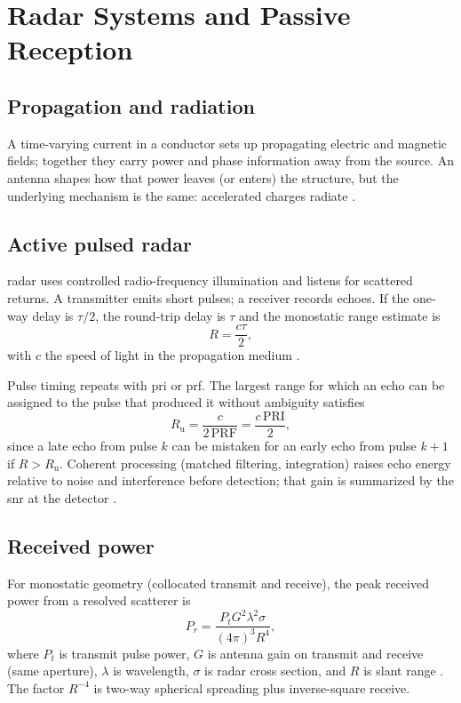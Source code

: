 \section{Radar Systems and Passive Reception}\label{sec:bg:radar}

\subsection{Propagation and radiation}

A time-varying current in a conductor sets up propagating electric and magnetic fields; together they carry power and phase information away from the source. An antenna shapes how that power leaves (or enters) the structure, but the underlying mechanism is the same: accelerated charges radiate \parencite{skolnik2008radar}.

\subsection{Active pulsed radar}

\Gls{radar} uses controlled radio-frequency illumination and listens for scattered returns. A transmitter emits short pulses; a receiver records echoes. If the one-way delay is $\tau/2$, the round-trip delay is $\tau$ and the monostatic range estimate is
\begin{equation}
\label{eq:bg:range}
R = \frac{c\tau}{2},
\end{equation}
with $c$ the speed of light in the propagation medium \parencite{skolnik2008radar}.

Pulse timing repeats with \gls{pri} or \gls{prf}. The largest range for which an echo can be assigned to the pulse that produced it without ambiguity satisfies
\begin{equation}
\label{eq:bg:runamb}
R_{\mathrm{u}} = \frac{c}{2\,\mathrm{PRF}} = \frac{c\,\mathrm{PRI}}{2},
\end{equation}
since a late echo from pulse $k$ can be mistaken for an early echo from pulse $k+1$ if $R > R_{\mathrm{u}}$. Coherent processing (matched filtering, integration) raises echo energy relative to noise and interference before detection; that gain is summarized by the \gls{snr} at the detector \parencite{skolnik2008radar}.

\subsection{Received power}

For monostatic geometry (collocated transmit and receive), the peak received power from a resolved scatterer is
\begin{equation}
\label{eq:bg:radar}
P_r = \frac{P_t G^2 \lambda^2 \sigma}{(4\pi)^3 R^4},
\end{equation}
where $P_t$ is transmit pulse power, $G$ is antenna gain on transmit and receive (same aperture), $\lambda$ is wavelength, $\sigma$ is radar cross section, and $R$ is slant range \parencite{skolnik2008radar}. The factor $R^{-4}$ is two-way spherical spreading plus inverse-square receive.

